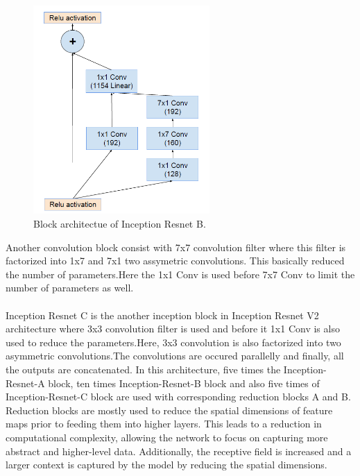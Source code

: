 \documentclass[a4paper,12pt,oneside]{book}
\begin{document}
\begin{figure}[!hbtp]
\centering
\includegraphics[width=0.6\textwidth]{Figures/inception_resnet_B.png}
\captionsetup{font=small}
\caption{Block architectue of Inception Resnet B.}
\label{fig:resnet}
\end{figure}
Another convolution block consist with 7x7 convolution filter where this filter is factorized into  1x7 and 7x1 two assymetric convolutions. This basically reduced the number of parameters.Here the 1x1 Conv is used before 7x7 Conv to limit the number of parameters as well.\\\\
Inception Resnet C is the another inception block in Inception Resnet V2 architecture where 3x3 convolution filter is used and before it 1x1 Conv is also used to reduce the parameters.Here, 3x3 convolution is also factorized into two asymmetric convolutions.The convolutions are occured parallelly and finally, all the outputs are concatenated. In this architecture, five times the Inception-Resnet-A block, ten times Inception-Resnet-B block and also five times of Inception-Resnet-C block are used with corresponding reduction blocks A and B.
Reduction blocks are mostly used to reduce the spatial dimensions of feature maps prior to feeding them into higher layers. This leads to a reduction in computational complexity, allowing the network to focus on capturing more abstract and higher-level data. Additionally, the receptive field is increased and a larger context is captured by the model by reducing the spatial dimensions.
\end{document}
